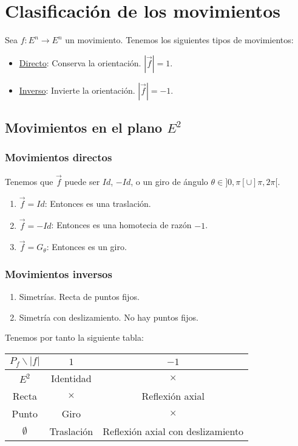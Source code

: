 \section{Clasificación de los movimientos}
Sea $f:E^n\to E^n$ un movimiento. Tenemos los siguientes tipos de movimientos:
\begin{itemize}
    \item \ul{Directo}: Conserva la orientación. $|\vec{f}|=1$.
    \item \ul{Inverso}: Invierte la orientación. $|\vec{f}|=-1$.
\end{itemize}

\subsection{Movimientos en el plano $E^2$}

\subsubsection{Movimientos directos}

Tenemos que $\vec{f}$ puede ser $Id$, $-Id$, o un giro de ángulo $\theta\in ]0,\pi[\cup ]\pi,2\pi[$.
\begin{enumerate}
    \item $\vec{f}=Id$: Entonces es una traslación.
    \item $\vec{f}=-Id$: Entonces es una homotecia de razón $-1$.
    \item $\vec{f}=G_{\theta}$: Entonces es un giro.
\end{enumerate}


\subsubsection{Movimientos inversos}

\begin{enumerate}
    \item Simetrías. Recta de puntos fijos.
    \item Simetría con deslizamiento. No hay puntos fijos.
\end{enumerate}

Tenemos por tanto la siguiente tabla:
\begin{table}[H]
    \centering
    \begin{tabular}{c||c|c}
        $P_f\backslash |f|$ & $1$ & $-1$  \\ \hline \hline
        $E^2$ & Identidad & $\times$ \\
        Recta & $\times$ & Reflexión axial \\
        Punto & Giro & $\times$ \\
        $\emptyset$ & Traslación & Reflexión axial con deslizamiento
    \end{tabular}
\end{table}


